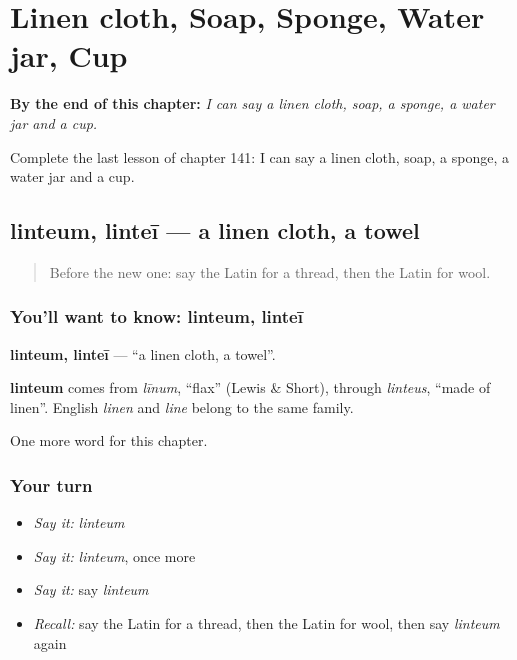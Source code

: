 
\chapter{Linen cloth, Soap, Sponge, Water jar, Cup}
\label{ch:la-linen-cloth-soap-sponge-water-jar-cup}

\begin{chapteropening}
\textbf{By the end of this chapter:} \emph{I can say a linen cloth, soap, a sponge, a water jar and a cup.}

Complete the last lesson of chapter 141: I can say a linen cloth, soap, a sponge, a water jar and a cup.
\end{chapteropening}

\section[linteum, linteī]{linteum, linteī — a linen cloth, a towel}

\label{lesson:LA-C141-linteum}



\begin{quote}
Before the new one: say the Latin for a thread, then the Latin for wool.
\end{quote}

\subsection*{You'll want to know: linteum, linteī}
\textbf{linteum, linteī} — \textquotedblleft{}a linen cloth, a towel\textquotedblright{}.

\begin{cousinweb}
\textbf{linteum} comes from \emph{līnum}, \textquotedblleft{}flax\textquotedblright{} (Lewis \& Short), through \emph{linteus}, \textquotedblleft{}made of linen\textquotedblright{}. English \emph{linen} and \emph{line} belong to the same family.
\end{cousinweb}

\begin{grammarlens}[title={What you've built}]
One more word for this chapter.
\end{grammarlens}

\subsection*{Your turn}
\begin{itemize}
\raggedright
  \item \emph{Say it:} \emph{linteum}
  \item \emph{Say it:} \emph{linteum}, once more
  \item \emph{Say it:} say \emph{linteum}
  \item \emph{Recall:} say the Latin for a thread, then the Latin for wool, then say \emph{linteum} again
\end{itemize}

